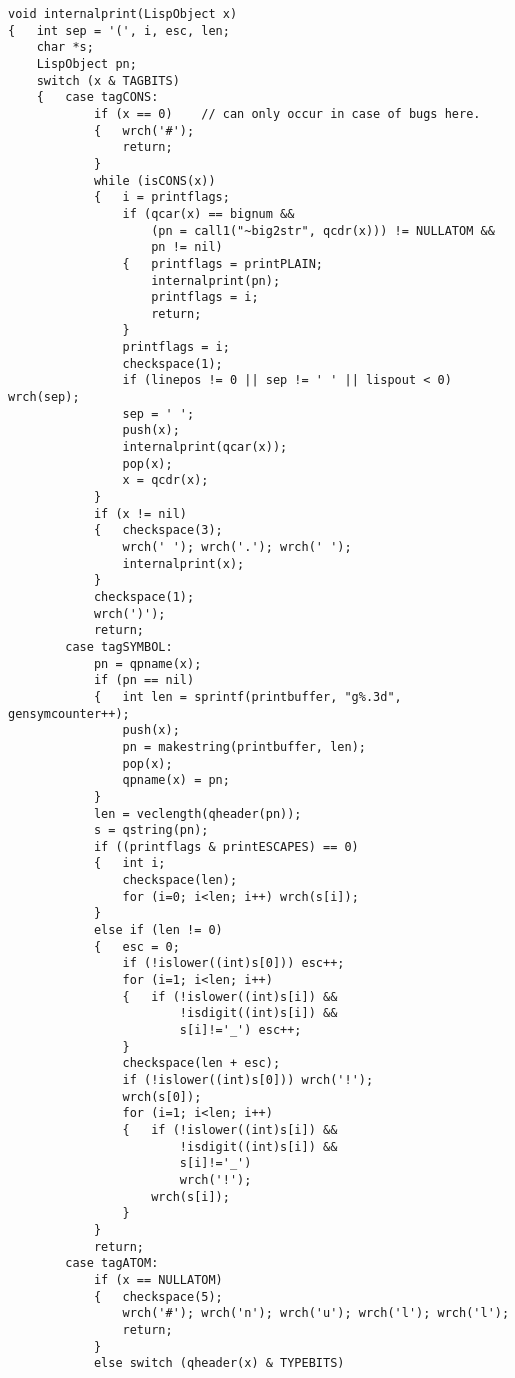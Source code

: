 {\begin{verbatim}
void internalprint(LispObject x)
{   int sep = '(', i, esc, len;
    char *s;
    LispObject pn;
    switch (x & TAGBITS)
    {   case tagCONS:
            if (x == 0)    // can only occur in case of bugs here.
            {   wrch('#');
                return;
            }
            while (isCONS(x))
            {   i = printflags;
                if (qcar(x) == bignum &&
                    (pn = call1("~big2str", qcdr(x))) != NULLATOM &&
                    pn != nil)
                {   printflags = printPLAIN;
                    internalprint(pn);
                    printflags = i;
                    return;
                }
                printflags = i;
                checkspace(1);
                if (linepos != 0 || sep != ' ' || lispout < 0) wrch(sep);
                sep = ' ';
                push(x);
                internalprint(qcar(x));
                pop(x);
                x = qcdr(x);
            }
            if (x != nil)
            {   checkspace(3);
                wrch(' '); wrch('.'); wrch(' ');
                internalprint(x);
            }
            checkspace(1);
            wrch(')');
            return;
        case tagSYMBOL:
            pn = qpname(x);
            if (pn == nil)
            {   int len = sprintf(printbuffer, "g%.3d", gensymcounter++);
                push(x);
                pn = makestring(printbuffer, len);
                pop(x);
                qpname(x) = pn;
            }
            len = veclength(qheader(pn));
            s = qstring(pn);
            if ((printflags & printESCAPES) == 0)
            {   int i;
                checkspace(len);
                for (i=0; i<len; i++) wrch(s[i]);
            }
            else if (len != 0)
            {   esc = 0;
                if (!islower((int)s[0])) esc++;
                for (i=1; i<len; i++)
                {   if (!islower((int)s[i]) &&
                        !isdigit((int)s[i]) &&
                        s[i]!='_') esc++;
                }
                checkspace(len + esc);
                if (!islower((int)s[0])) wrch('!');
                wrch(s[0]);
                for (i=1; i<len; i++)
                {   if (!islower((int)s[i]) &&
                        !isdigit((int)s[i]) &&
                        s[i]!='_')
                        wrch('!');
                    wrch(s[i]);
                }
            }
            return;
        case tagATOM:
            if (x == NULLATOM)
            {   checkspace(5);
                wrch('#'); wrch('n'); wrch('u'); wrch('l'); wrch('l');
                return;
            }
            else switch (qheader(x) & TYPEBITS)

\end{verbatim}}
